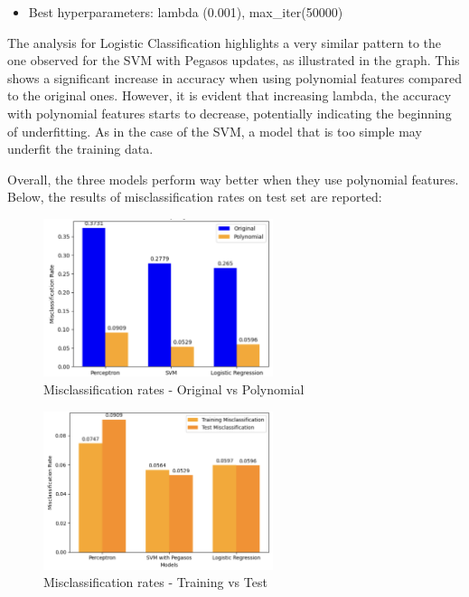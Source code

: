 \documentclass[a4paper, 10pt]{article}
\begin{document}
\begin{itemize}
    \item Best hyperparameters: lambda (0.001), max\_iter(50000)
\end{itemize}

The analysis for Logistic Classification highlights a very similar pattern to the one observed for the SVM with Pegasos updates, as illustrated in the graph. This shows a significant increase in accuracy when using polynomial features compared to the original ones.
However, it is evident that increasing lambda, the accuracy with polynomial features starts to decrease, potentially indicating the beginning of underfitting. As in the case of the SVM, a model that is too simple may underfit the training data.

Overall, the three models perform way better when they use polynomial features. Below, the results of misclassification rates on test set are reported:
\begin{figure}[H]
    \centering
    \includegraphics[width=0.6\textwidth]{images/missPOLY.png}
    \caption{Misclassification rates - Original vs Polynomial}
    \label{fig:missPOLY}
\end{figure}

\begin{figure}[H]
    \centering
    \includegraphics[width=0.6\textwidth]{images/polyTEST.png}
    \caption{Misclassification rates - Training vs Test}
    \label{fig:polyTEST}
\end{figure}
\end{document}
